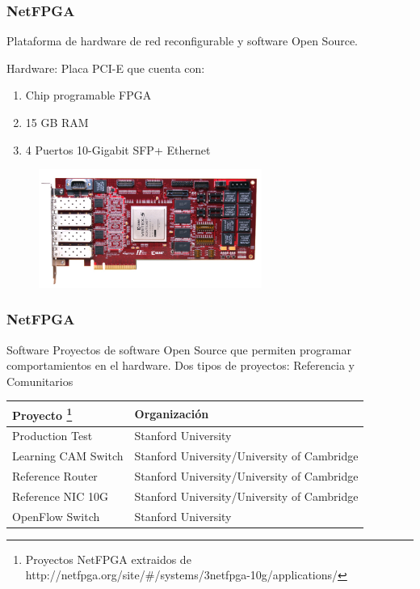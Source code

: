 \documentclass{beamer}
\begin{document}
\begin{frame}
\frametitle{NetFPGA} 


	Plataforma de hardware de red reconfigurable y software Open Source.



		Hardware: Placa PCI-E que cuenta con: 
		\begin{enumerate}
			\item Chip programable FPGA 
			\item 15 GB RAM
			\item 4 Puertos 10-Gigabit SFP+ Ethernet
		\end{enumerate}
		
	\begin{figure}[H]
		\centering
		\includegraphics[width=0.65\textwidth]{imagenes/NetFPGA10G_web.jpg}
	\end{figure}


\end{frame}


\begin{frame}
\frametitle{NetFPGA} 
\begin{block}{Software}
Proyectos de software Open Source que permiten programar comportamientos en el hardware. Dos tipos de proyectos: Referencia y Comunitarios

\end{block}

\begin{table}[]
\small
\centering
\label{label}
\begin{tabular}{| p{3.7cm} | p{6.8cm} |}

\hline
\multicolumn{1}{|l|}{Proyecto \footnote[frame]{\tiny Proyectos NetFPGA extraidos de http://netfpga.org/site/\#/systems/3netfpga-10g/applications/}} & \multicolumn{1}{l|}{Organizaci\'on}\\
\hline
Production Test  & Stanford University \\
Learning CAM Switch &  Stanford University/University of Cambridge \\
Reference Router  &  Stanford University/University of Cambridge  \\
Reference NIC 10G  &  Stanford University/University of Cambridge  \\
\hline
OpenFlow Switch & Stanford University  \\
\hline  
\end{tabular}
\end{table}


\end{frame}
\end{document}
